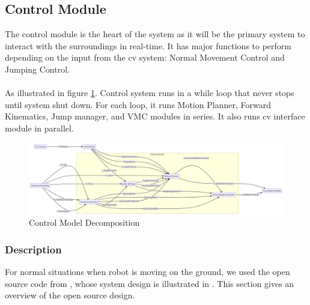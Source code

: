 \documentclass[12pt]{article}
\begin{document}
    \subsection{Control Module} \label{sec:Control Module}
        The control module is the heart of the system as it will be the primary system to interact with the surroundings in real-time. It has major functions to perform depending on the input from the \acrshort{cv} system: Normal Movement Control and Jumping Control.\\\\
        As illustrated in figure \ref{fig:Control Module Decomposition.png}. Control system runs in a while loop that never stops until system shut down. For each loop, it runs Motion Planner, Forward Kinematics, Jump manager, and VMC modules in series. It also runs \acrshort{cv} interface module in parallel. 
        \begin{figure}
            \centering
            \includegraphics[width=\textwidth,height=\textheight,keepaspectratio]{../Control Module Decomposition.png}
            \caption{Control Model Decomposition}
            \label{fig:Control Module Decomposition.png}
        \end{figure}
            
        \subsubsection{Description}
            For normal situations when robot is moving on the ground, we used the open source code from \cite{HarbinEngWebotsGit2024}, whose system design is illustrated in \cite{HarbinEngCtrlDesign2022}. This section gives an overview of the open source design.\\\\
        
\end{document}
